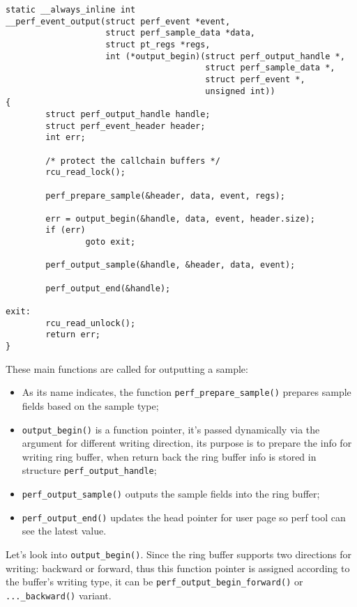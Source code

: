 \documentclass[11pt]{diazessay} %
\def\code#1{\texttt{#1}}
\begin{document}
\begin{lstlisting}[escapechar = !]
static __always_inline int
__perf_event_output(struct perf_event *event,
                    struct perf_sample_data *data,
                    struct pt_regs *regs,
                    int (*output_begin)(struct perf_output_handle *,
                                        struct perf_sample_data *,
                                        struct perf_event *,
                                        unsigned int))
{
        struct perf_output_handle handle;
        struct perf_event_header header;
        int err;

        /* protect the callchain buffers */
        rcu_read_lock();

        perf_prepare_sample(&header, data, event, regs);

        err = output_begin(&handle, data, event, header.size);
        if (err)
                goto exit;

        perf_output_sample(&handle, &header, data, event);

        perf_output_end(&handle);

exit:
        rcu_read_unlock();
        return err;
}
\end{lstlisting}

These main functions are called for outputting a sample:
\begin{itemize}
	\item As its name indicates, the function \code{perf\_prepare\_sample()} prepares sample fields based on the sample type;
	\item \code{output\_begin()} is a function pointer, it's passed dynamically via the argument for different writing direction, its purpose is to prepare the info for writing ring buffer, when return back the ring buffer info is stored in structure \code{perf\_output\_handle};
	\item \code{perf\_output\_sample()} outputs the sample fields into the ring buffer;
	\item \code{perf\_output\_end()} updates the head pointer for user page so perf tool can see the latest value.
\end{itemize}

Let's look into \code{output\_begin()}.  Since the ring buffer supports two directions for writing: backward or forward, thus this function pointer is assigned according to the buffer's writing type, it can be \code{perf\_output\_begin\_forward()} or \code{...\_backward()} variant.
\end{document}
